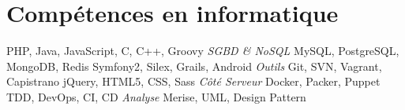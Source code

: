 \documentclass[11pt,a4paper]{moderncv}
\begin{document}
    \section{Compétences en informatique}
         {PHP, Java, JavaScript, C, C++, Groovy}
            {\textit{SGBD \& NoSQL}} {MySQL, PostgreSQL, MongoDB, Redis}
         {Symfony2, Silex, Grails, Android }
            {\textit{Outils}} {Git, SVN, Vagrant, Capistrano}
         {jQuery, HTML5, CSS, Sass}
            {\textit{Côté Serveur}} {Docker, Packer, Puppet}
         {TDD, DevOps, CI, CD}
            {\textit{Analyse}} {Merise, UML, Design Pattern}
\end{document}
